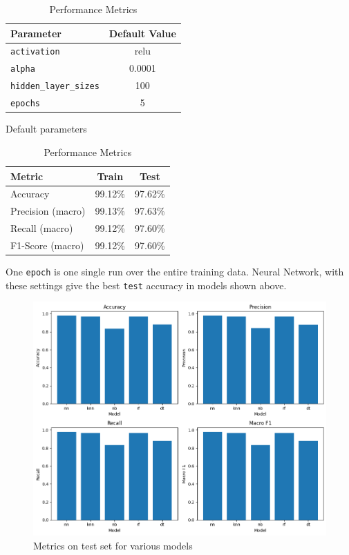 \begin{table}[h!]
  \begin{minipage}{.5\linewidth}
    \centering
    \begin{tabular}{|l|c|}
      \hline
      \textbf{Parameter} & \textbf{Default Value} \\
      \hline
      \texttt{activation} & relu \\
      \texttt{alpha} & 0.0001 \\
      \texttt{hidden\_layer\_sizes} & 100 \\
      \texttt{epochs} & 5 \\
      \hline
    \end{tabular}
    \caption{Default parameters}
  \end{minipage}%
  \begin{minipage}{.5\linewidth}
    \centering
    \begin{tabular}{|l|c|c|}
      \hline
      \textbf{Metric} & \textbf{Train} & \textbf{Test} \\
      \hline
      Accuracy & 99.12\% & 97.62\% \\
      Precision (macro) & 99.13\% & 97.63\% \\
      Recall (macro) & 99.12\% & 97.60\% \\
      F1-Score (macro) & 99.12\% & 97.60\% \\
      \hline
    \end{tabular}
    \caption{Performance Metrics}
  \end{minipage}
\end{table}


One \verb|epoch| is one single run over the entire training data. Neural Network, with these settings give the best \verb|test| accuracy in models shown above.

\begin{figure}[h!]
    \centering
    \includegraphics[width=0.8\linewidth]{images/acc_models.png}
    \caption{Metrics on test set for various models}
\end{figure}